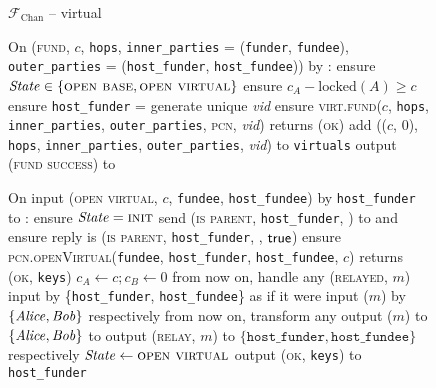 \begin{figure}[H]
  \begin{systembox}{$\mathcal{F}_{\mathrm{Chan}}$ -- virtual}
    \begin{algorithmic}[1]
      \State On (\textsc{fund}, $c$, \texttt{hops}, \texttt{inner\_parties} =
      (\texttt{funder}, \texttt{fundee}), \texttt{outer\_parties} =
      (\texttt{host\_funder}, \texttt{host\_fundee})) by \alice:
      \label{code:functionality:chan:skeleton:virtual:fund}
      \Indent
        \State ensure $\mathit{State} \in \{\textsc{open base}, \textsc{open
        virtual}\}$
        \label{code:functionality:chan:skeleton:virtual:fund:start}
        \State ensure $c_A - \mathrm{locked}(A) \geq c$
        \State ensure \texttt{host\_funder} = \alice
        \label{code:functionality:chan:skeleton:virtual:fund:id}
        \State generate unique \textit{vid}
        \label{code:functionality:chan:skeleton:virtual:id}
        \State ensure \textsc{virt.fund}($c$, \texttt{hops},
        \texttt{inner\_parties}, \texttt{outer\_parties}, \textsc{pcn},
        \textit{vid}) returns (\textsc{ok})
        \label{code:functionality:chan:skeleton:virtual:fund:virt}
        \State add (($c$, 0), \texttt{hops}, \texttt{inner\_parties},
        \texttt{outer\_parties}, \textit{vid}) to \texttt{virtuals}
        \label{code:functionality:chan:skeleton:virtual:fund:store}
        \State output (\textsc{fund success}) to \alice
        \label{code:functionality:chan:skeleton:virtual:fund:end}
      \EndIndent
      \Statex

      \State On input (\textsc{open virtual}, $c$, \texttt{fundee},
      \texttt{host\_fundee}) by \texttt{host\_funder} to \alice:
      \label{code:functionality:chan:skeleton:virtual:open-virtual}
      \Indent
        \State ensure $\mathit{State} = \textsc{init}$
        \State send (\textsc{is parent}, \texttt{host\_funder}, \alice) to
        \gtrust and ensure reply is (\textsc{is parent}, \texttt{host\_funder},
        \alice, $\mathsf{true}$) 
        \State ensure \textsc{pcn.openVirtual}(\texttt{fundee},
        \texttt{host\_funder}, \texttt{host\_fundee}, $c$) returns
        (\textsc{ok}, \texttt{keys})
        \label{code:functionality:chan:skeleton:virtual:ln}
        \State $c_A \gets c; c_B \gets 0$
        \State from now on, handle any (\textsc{relayed}, $m$) input by
        \{\texttt{host\_funder}, \texttt{host\_fundee}\} as if it were input
        ($m$) by $\{\mathit{Alice}, \mathit{Bob}\}$ respectively
        \State from now on, transform any output ($m$) to $\{\mathit{Alice}, \mathit{Bob}\}$ to
        output (\textsc{relay}, $m$) to $\{\texttt{host\_funder},
        \texttt{host\_fundee}\}$ respectively
        \State $\mathit{State} \gets \textsc{open virtual}$
        \State output (\textsc{ok}, \texttt{keys}) to \texttt{host\_funder}
      \EndIndent
      \Statex


\end{algorithmic}
\end{systembox}
\end{figure}
